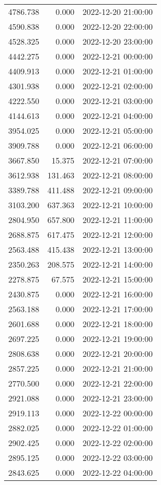 \documentclass[
]{article}
\begin{document}
\begin{longtable}[]{@{}rrl@{}}
4786.738 & 0.000 & 2022-12-20 21:00:00 \\
4590.838 & 0.000 & 2022-12-20 22:00:00 \\
4528.325 & 0.000 & 2022-12-20 23:00:00 \\
4442.275 & 0.000 & 2022-12-21 00:00:00 \\
4409.913 & 0.000 & 2022-12-21 01:00:00 \\
4301.938 & 0.000 & 2022-12-21 02:00:00 \\
4222.550 & 0.000 & 2022-12-21 03:00:00 \\
4144.613 & 0.000 & 2022-12-21 04:00:00 \\
3954.025 & 0.000 & 2022-12-21 05:00:00 \\
3909.788 & 0.000 & 2022-12-21 06:00:00 \\
3667.850 & 15.375 & 2022-12-21 07:00:00 \\
3612.938 & 131.463 & 2022-12-21 08:00:00 \\
3389.788 & 411.488 & 2022-12-21 09:00:00 \\
3103.200 & 637.363 & 2022-12-21 10:00:00 \\
2804.950 & 657.800 & 2022-12-21 11:00:00 \\
2688.875 & 617.475 & 2022-12-21 12:00:00 \\
2563.488 & 415.438 & 2022-12-21 13:00:00 \\
2350.263 & 208.575 & 2022-12-21 14:00:00 \\
2278.875 & 67.575 & 2022-12-21 15:00:00 \\
2430.875 & 0.000 & 2022-12-21 16:00:00 \\
2563.188 & 0.000 & 2022-12-21 17:00:00 \\
2601.688 & 0.000 & 2022-12-21 18:00:00 \\
2697.225 & 0.000 & 2022-12-21 19:00:00 \\
2808.638 & 0.000 & 2022-12-21 20:00:00 \\
2857.225 & 0.000 & 2022-12-21 21:00:00 \\
2770.500 & 0.000 & 2022-12-21 22:00:00 \\
2921.088 & 0.000 & 2022-12-21 23:00:00 \\
2919.113 & 0.000 & 2022-12-22 00:00:00 \\
2882.025 & 0.000 & 2022-12-22 01:00:00 \\
2902.425 & 0.000 & 2022-12-22 02:00:00 \\
2895.125 & 0.000 & 2022-12-22 03:00:00 \\
2843.625 & 0.000 & 2022-12-22 04:00:00 \\

\end{longtable}
\end{document}
